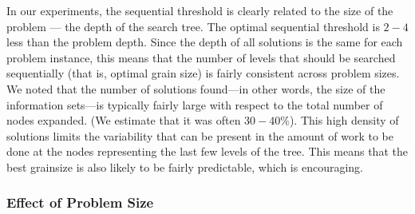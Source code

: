 \documentclass[10pt, conference, compsocconf]{IEEEtran}
\begin{document}
In our experiments, the sequential threshold is clearly related to the size of the
problem --- the depth of the search tree.  The optimal sequential threshold is $2-4$ less than the problem depth.  Since the depth of all solutions is
the same for each problem instance, this means that the number of levels that
should be searched sequentially (that is, optimal grain size) is fairly consistent across problem sizes.  We
noted that the number of solutions found---in other words, the size of the
information sets---is typically fairly large with respect to the total number
of nodes expanded.  (We estimate that it was often $30-40\%$).  This high
density of solutions limits the variability that can be present in the amount
of work to be done at the nodes representing the last few levels of the tree.
This means that the best grainsize is also likely to be fairly predictable,
which is encouraging.  

\subsubsection{Effect of Problem Size}
\end{document}
